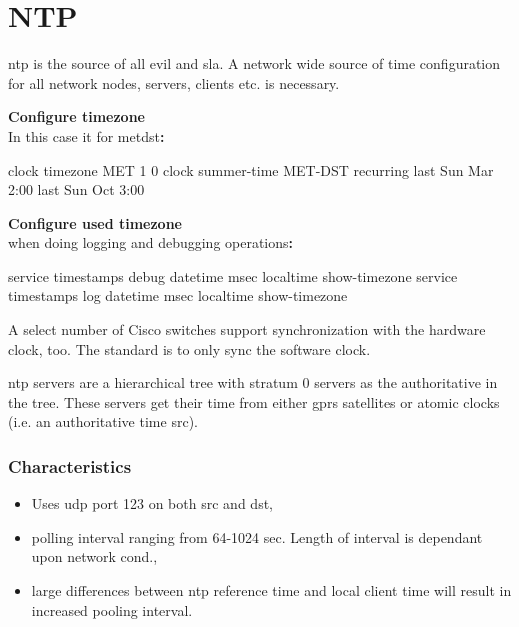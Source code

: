 \chapter{NTP}

\gls{ntp} is the source of all evil and \gls{sla}. A network wide source of time configuration for all network nodes, servers, clients etc. is necessary.

\textbf{Configure timezone}\\In this case it for \gls{metdst}\textbf{:}

\begin{txt}
clock timezone MET 1 0
clock summer-time MET-DST recurring last Sun Mar 2:00 last Sun Oct 3:00
\end{txt}

\textbf{Configure used timezone}\\when doing logging and debugging operations\textbf{:}

\begin{txt}
service timestamps debug datetime msec localtime show-timezone
service timestamps log datetime msec localtime show-timezone
\end{txt}

A select number of Cisco switches support synchronization with the hardware clock, too. The standard is to only sync the software clock.\\


\gls{ntp} servers are a hierarchical tree with stratum 0 servers as the authoritative in the tree. These servers get their time from either \gls{gprs} satellites or atomic clocks {\footnotesize (i.e. an authoritative time \gls{src})}.

\subsection{Characteristics}

\begin{itemize}
	\item Uses \gls{udp} port 123 on both \gls{src} and \gls{dst},
	\item polling interval ranging from 64-1024 sec. Length of interval is dependant upon network cond.,
	\item large differences between \gls{ntp} reference time and local client time will result in increased pooling interval.
\end{itemize}


